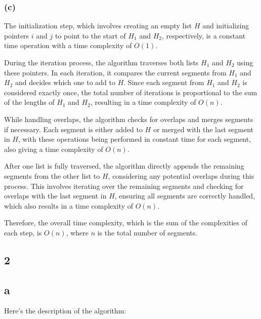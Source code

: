 \documentclass[12pt]{article}
\begin{document}
        \subsubsection*{(c)}

        \hspace{1.5em}The initialization step, which involves creating an empty list \( H \) and initializing pointers \( i \) and \( j \) to point to the start of \( H_1 \) and \( H_2 \), respectively, is a constant time operation with a time complexity of \( O(1) \). 

        During the iteration process, the algorithm traverses both lists \( H_1 \) and \( H_2 \) using these pointers. In each iteration, it compares the current segments from \( H_1 \) and \( H_2 \) and decides which one to add to \( H \). Since each segment from \( H_1 \) and \( H_2 \) is considered exactly once, the total number of iterations is proportional to the sum of the lengths of \( H_1 \) and \( H_2 \), resulting in a time complexity of \( O(n) \). 

        While handling overlaps, the algorithm checks for overlaps and merges segments if necessary. Each segment is either added to \( H \) or merged with the last segment in \( H \), with these operations being performed in constant time for each segment, also giving a time complexity of \( O(n) \). 

        After one list is fully traversed, the algorithm directly appends the remaining segments from the other list to \( H \), considering any potential overlaps during this process. This involves iterating over the remaining segments and checking for overlaps with the last segment in \( H \), ensuring all segments are correctly handled, which also results in a time complexity of \( O(n) \). 

        Therefore, the overall time complexity, which is the sum of the complexities of each step, is \( O(n) \), where \( n \) is the total number of segments.


    \subsection*{2}
        \subsection*{a}

        Here’s the description of the algorithm:
\end{document}
